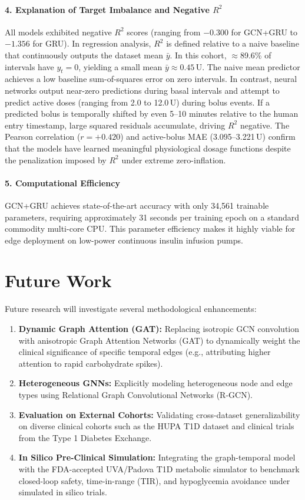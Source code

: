 \documentclass[10pt,a4paper]{article}
\begin{document}
\paragraph{4. Explanation of Target Imbalance and Negative $R^2$}
All models exhibited negative $R^2$ scores (ranging from $-0.300$ for GCN+GRU to $-1.356$ for GRU). In regression analysis, $R^2$ is defined relative to a naive baseline that continuously outputs the dataset mean $\bar{y}$. In this cohort, $\approx$89.6\% of intervals have $y_t = 0$, yielding a small mean $\bar{y} \approx 0.45$\,U. The naive mean predictor achieves a low baseline sum-of-squares error on zero intervals. In contrast, neural networks output near-zero predictions during basal intervals and attempt to predict active doses (ranging from 2.0 to 12.0\,U) during bolus events. If a predicted bolus is temporally shifted by even 5--10 minutes relative to the human entry timestamp, large squared residuals accumulate, driving $R^2$ negative. The Pearson correlation ($r = +0.420$) and active-bolus MAE (3.095--3.221\,U) confirm that the models have learned meaningful physiological dosage functions despite the penalization imposed by $R^2$ under extreme zero-inflation.

\paragraph{5. Computational Efficiency}
GCN+GRU achieves state-of-the-art accuracy with only 34,561 trainable parameters, requiring approximately 31 seconds per training epoch on a standard commodity multi-core CPU. This parameter efficiency makes it highly viable for edge deployment on low-power continuous insulin infusion pumps.

\section{Future Work}
Future research will investigate several methodological enhancements:
\begin{enumerate}
    \item \textbf{Dynamic Graph Attention (GAT):} Replacing isotropic GCN convolution with anisotropic Graph Attention Networks (GAT) to dynamically weight the clinical significance of specific temporal edges (e.g., attributing higher attention to rapid carbohydrate spikes).
    \item \textbf{Heterogeneous GNNs:} Explicitly modeling heterogeneous node and edge types using Relational Graph Convolutional Networks (R-GCN).
    \item \textbf{Evaluation on External Cohorts:} Validating cross-dataset generalizability on diverse clinical cohorts such as the HUPA T1D dataset and clinical trials from the Type 1 Diabetes Exchange.
    \item \textbf{In Silico Pre-Clinical Simulation:} Integrating the graph-temporal model with the FDA-accepted UVA/Padova T1D metabolic simulator to benchmark closed-loop safety, time-in-range (TIR), and hypoglycemia avoidance under simulated in silico trials.
\end{enumerate}
\end{document}
